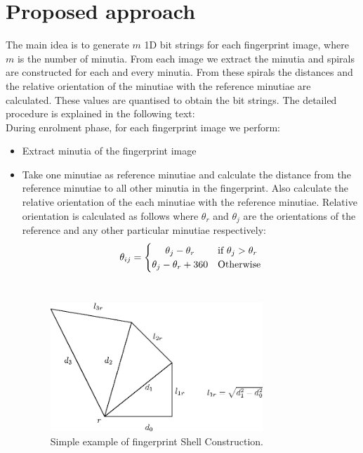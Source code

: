 \documentclass[14pt, oneside]{article}   	%
\begin{document}
\section{Proposed approach}
The main idea is to generate $m$ 1D bit strings for each fingerprint image, where $m$ is the number of minutia. From each image we extract the minutia and spirals are constructed for each and every minutia. From these spirals the distances and the relative orientation of the minutiae with the reference minutiae are calculated. These values are quantised to obtain the bit strings. The detailed procedure is explained in the following text:\\
During enrolment phase, for each fingerprint image we perform:\\
\begin{itemize}
\item Extract minutia of the fingerprint image
\item Take one minutiae as reference minutiae and calculate the distance from the reference minutiae to all other minutia in the fingerprint. Also calculate the relative orientation of the each minutiae with the reference minutiae. Relative orientation is calculated as follows where $\theta_r$ and $\theta_j$ are the orientations of the reference and any other particular minutiae respectively:\\
\[\theta_{ij}=\left\{\def\arraystretch{1.2}%
  \begin{array}{@{}c@{\quad}l@{}}
    \theta_{j}-\theta_{r} & \text{if $\theta_j > \theta_r$}\\
    \theta_{j}-\theta_{r}+360 & \text{Otherwise}\\
  \end{array}\right.
\]
\\
\begin{figure}[htbp]
\begin{center}
\includegraphics[width=80mm,scale=0.5]{spiral.eps}
\caption{Simple example of fingerprint Shell Construction.}
\end{center}
\end{figure} 




\end{itemize}
\end{document}
